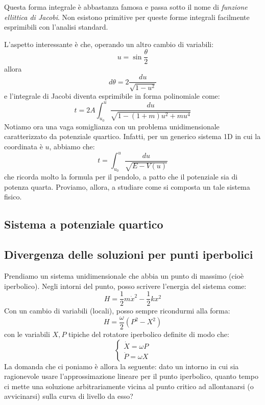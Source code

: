 \documentclass[a4paper,openany]{article}
\begin{document}
	Questa forma integrale è abbastanza famosa e passa sotto il nome di \textit{funzione ellittica di Jacobi}. Non esistono primitive per queste forme integrali facilmente esprimibili con l'analisi standard.
	
	L'aspetto interessante è che, operando un altro cambio di variabili:
	$$
	u = \sin\dfrac{\theta}{2}
	$$
	allora 
	$$
	d\theta = 2 \dfrac{du}{\sqrt{1-u^2}}
	$$
	e l'integrale di Jacobi diventa esprimibile in forma polinomiale come:
	\begin{equation}\label{key}
		t = 2A\int_{u_0}^{u}\dfrac{du}{\sqrt{1-(1+m)u^2+mu^4}}
	\end{equation}
	Notiamo ora una vaga somiglianza con un problema unidimensionale caratterizzato da potenziale quartico. Infatti, per un generico sistema 1D in cui la coordinata è $u$, abbiamo che:
	\begin{equation}\label{key}
		t = \int_{u_0}^{u}\dfrac{du}{\sqrt{E-V(u)}}
	\end{equation}
	che ricorda molto la formula per il pendolo, a patto che il potenziale sia di potenza quarta. Proviamo, allora, a studiare come si composta un tale sistema fisico.
	\subsection{Sistema a potenziale quartico}
	\subsection{Divergenza delle soluzioni per punti iperbolici}
	Prendiamo un sistema unidimensionale che abbia un punto di massimo (cioè iperbolico). Negli intorni del punto, posso scrivere l'energia del sistema come:
	$$
	H = \dfrac{1}{2}m\dot{x}^2 - \dfrac{1}{2}kx^2
	$$
	Con un cambio di variabili (locali), posso sempre ricondurmi alla forma:
	$$
	H = \dfrac{\omega}{2}(P^2-X^2)
	$$
	con le variabili $X,P$ tipiche del rotatore iperbolico definite di modo che:
	\begin{equation}\label{key}
		\begin{cases}
			\dot{X} = \omega P \\
			\dot{P} = \omega X
		\end{cases}
	\end{equation}
	La domanda che ci poniamo è allora la seguente: dato un intorno in cui sia ragionevole usare l'approssimazione lineare per il punto iperbolico, quanto tempo ci mette una soluzione arbitrariamente vicina al punto critico ad allontanarsi (o avvicinarsi) sulla curva di livello da esso?
	
\end{document}
